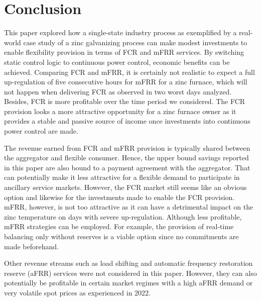 \documentclass[conference]{IEEEtran}
\begin{document}
\vspace{1mm}
\section{Conclusion} \label{conc}
\vspace{-1mm}
This paper explored how a single-state industry process as exemplified by a real-world case study of a zinc galvanizing process can make modest investments to enable flexibility provision in terms of FCR and mFRR services. By switching static control logic to continuous power control, economic benefits can be achieved. Comparing FCR and mFRR, it is certainly not realistic to expect a full up-regulation of five consecutive hours for mFRR for a zinc furnace, which will not happen when delivering FCR as observed in two worst days analyzed. Besides, FCR is more profitable over the time period we considered. The FCR provision looks a more attractive opportunity for a zinc furnace owner as it provides a stable and passive source of income once investments into continuous power control are made.

The revenue earned from FCR and mFRR provision is typically shared between the aggregator and flexible consumer. Hence, the upper bound savings reported in this paper are also bound to a payment agreement with the aggregator. That can potentially make it less attractive for a flexible demand to participate in ancillary service markets. However, the FCR market still seems like an obvious option and likewise for the investments made to enable the FCR provision. mFRR, however, is not too attractive as it can have a detrimental impact on the zinc temperature on days with severe up-regulation. Although less profitable, mFRR strategies can be employed. For example, the provision of real-time balancing only without reserves is a viable option since no commitments are made beforehand.

Other revenue streams such as load shifting and automatic frequency restoration reserve (aFRR) services were not considered in this paper. However, they can also potentially  be profitable in certain market regimes with a high aFRR demand or very volatile spot prices as experienced in 2022.
\end{document}
